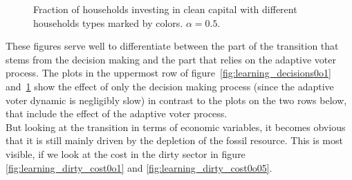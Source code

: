\begin{figure}[t]
	\centering
	\caption{Fraction of households investing in clean capital with different households types marked by colors. $\alpha=0.5$.}
	\label{fig:learning_decisions0o05}
\end{figure}
These figures serve well to differentiate between the part of the transition that stems from the decision making and the part that relies on the adaptive voter process.
The plots in the uppermost row of figure~\ref{fig:learning_decisions0o1} and~\ref{fig:learning_decisions0o05} show the effect of only the decision making process (since the adaptive voter dynamic is negligibly slow) in contrast to the plots on the two rows below, that include the effect of the adaptive voter process.\\

But looking at the transition in terms of economic variables, it becomes obvious that it is still mainly driven by the depletion of the fossil resource. This is most visible, if we look at the cost in the dirty sector in figure \ref{fig:learning_dirty_cost0o1} and \ref{fig:learning_dirty_cost0o05}.

